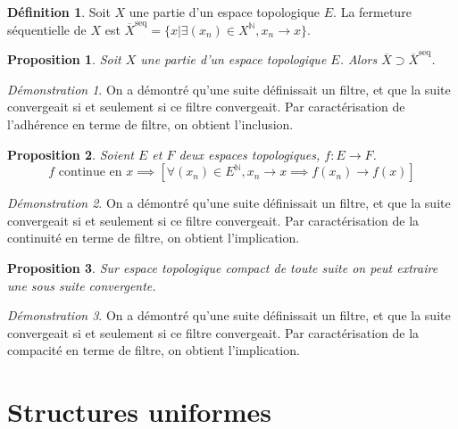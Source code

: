 \documentclass[a4paper, 11pt, french]{book}
\theoremstyle{plain} %
\newtheorem{proposition}{Proposition}
\theoremstyle{definition} %
\newtheorem{definition}{Définition}
\theoremstyle{remark} %
\newtheorem*{demonstration}{Démonstration}
\newcommand{\1}{\mathds{1}}
\newcommand{\N}{\mathbb{N}}
\begin{document}
\begin{definition}
	Soit $X$ une partie d'un espace topologique $E$.
	La fermeture séquentielle de $X$ est $\overline{X}^\text{seq}=\{x | \exists(x_n)\in X^\N, x_n\rightarrow x\}$.
\end{definition}

\begin{proposition}
	Soit $X$ une partie d'un espace topologique $E$.
	Alors $\overline{X}\supset\overline{X}^\text{seq}$.
\end{proposition}

\begin{demonstration}
	On a démontré qu'une suite définissait un filtre, et que la suite convergeait si et seulement si ce filtre convergeait.
	Par caractérisation de l'adhérence en terme de filtre, on obtient l'inclusion.
\end{demonstration}

\begin{proposition}
	Soient $E$ et $F$ deux espaces topologiques, $f:E\rightarrow F$.
	$$
		\text{$f$ continue en $x$}
		\implies
		\left[\forall(x_n)\in E^\N, x_n\rightarrow x\implies f(x_n)\rightarrow f(x)\right]
	$$
\end{proposition}

\begin{demonstration}
	On a démontré qu'une suite définissait un filtre, et que la suite convergeait si et seulement si ce filtre convergeait.
	Par caractérisation de la continuité en terme de filtre, on obtient l'implication.
\end{demonstration}

\begin{proposition}
	Sur espace topologique compact de toute suite on peut extraire une sous suite convergente.
\end{proposition}

\begin{demonstration}
	On a démontré qu'une suite définissait un filtre, et que la suite convergeait si et seulement si ce filtre convergeait.
	Par caractérisation de la compacité en terme de filtre, on obtient l'implication.
\end{demonstration}

\chapter{Structures uniformes}
\end{document}
